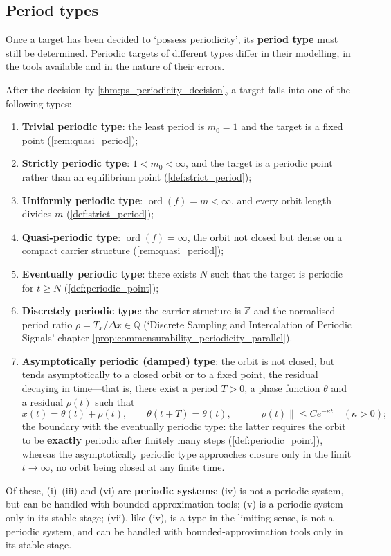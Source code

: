 \subsection{Period types}

Once a target has been decided to `possess periodicity', its \textbf{period type} must still be determined. Periodic targets of different types differ in their modelling, in the tools available and in the nature of their errors.

\begin{definition}\label{def:ps_period_type}
After the decision by \cref{thm:ps_periodicity_decision}, a target falls into one of the following types:
\begin{enumerate}[label=(\roman*)]
    \item \textbf{Trivial periodic type}: the least period is $m_0=1$ and the target is a fixed point (\cref{rem:quasi_period});
    \item \textbf{Strictly periodic type}: $1<m_0<\infty$, and the target is a periodic point rather than an equilibrium point (\cref{def:strict_period});
    \item \textbf{Uniformly periodic type}: $\operatorname{ord}(f)=m<\infty$, and every orbit length divides $m$ (\cref{def:strict_period});
    \item \textbf{Quasi-periodic type}: $\operatorname{ord}(f)=\infty$, the orbit not closed but dense on a compact carrier structure (\cref{rem:quasi_period});
    \item \textbf{Eventually periodic type}: there exists $N$ such that the target is periodic for $t\ge N$ (\cref{def:periodic_point});
    \item \textbf{Discretely periodic type}: the carrier structure is $\mathbb{Z}$ and the normalised period ratio $\rho=T_x/\Delta x\in\mathbb{Q}$ (`Discrete Sampling and Intercalation of Periodic Signals' chapter \cref{prop:commensurability_periodicity_parallel}).
    \item \textbf{Asymptotically periodic (damped) type}: the orbit is not closed, but tends asymptotically to a closed orbit or to a fixed point, the residual decaying in time---that is, there exist a period $T>0$, a phase function $\theta$ and a residual $\rho(t)$ such that
    \[
    x(t)=\theta(t)+\rho(t),\qquad \theta(t+T)=\theta(t),\qquad \|\rho(t)\|\le Ce^{-\kappa t}\quad(\kappa>0);
    \]
    the boundary with the eventually periodic type: the latter requires the orbit to be \textbf{exactly} periodic after finitely many steps (\cref{def:periodic_point}), whereas the asymptotically periodic type approaches closure only in the limit $t\to\infty$, no orbit being closed at any finite time.
\end{enumerate}
Of these, (i)--(iii) and (vi) are \textbf{periodic systems}; (iv) is not a periodic system, but can be handled with bounded-approximation tools; (v) is a periodic system only in its stable stage; (vii), like (iv), is a type in the limiting sense, is not a periodic system, and can be handled with bounded-approximation tools only in its stable stage.
\end{definition}

